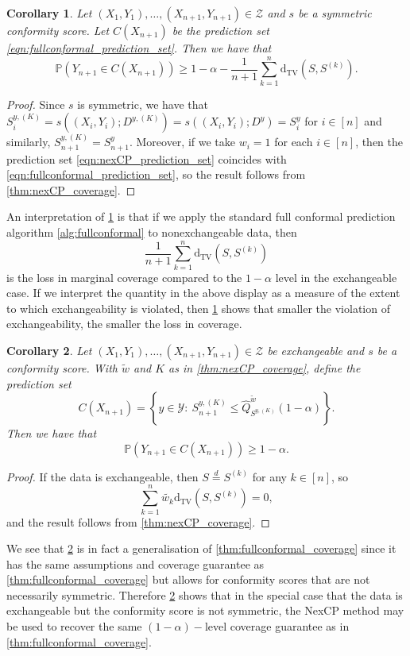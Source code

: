 \documentclass[11pt, titlepage]{article} %
\newcommand{\R}{\mathrm}
\newcommand{\Prob}[1]{\mathbb{P}\left( #1 \right)}
\numberwithin{equation}{section}
\newtheorem{corollary}{Corollary}
\theoremstyle{definition}
\numberwithin{theorem}{section}
\numberwithin{lemma}{section}
\numberwithin{corollary}{section}
\numberwithin{proposition}{section}
\numberwithin{definition}{section}
\numberwithin{remark}{section}
\begin{document}
\begin{corollary}
    Let \((X_1, Y_1), \ldots, (X_{n+1}, Y_{n+1}) \in \mathcal{Z}\) and \(s\) be a symmetric conformity score. Let \(C(X_{n+1})\) be the prediction set \eqref{eqn:fullconformal_prediction_set}. Then we have that \[
        \Prob{Y_{n+1} \in C(X_{n+1})}  \geq 1-\alpha - \frac{1}{n+1} \sum_{k=1}^{n} \R{d_{TV}}(S, S^{(k)}).
    \]
\label{corr:nexCP_robustness}
\end{corollary}
\begin{proof}
    Since \(s\) is symmetric, we have that \(S_{i}^{y, (K)} = s((X_i, Y_i); D^{y, (K)}) = s((X_i, Y_i); D^{y}) = S_i^y\) for \(i \in [n]\) and similarly, \(S_{n+1}^{y, (K)} = S_{n+1}^y\). Moreover, if we take \(w_i = 1\) for each \(i \in [n]\), then the prediction set \eqref{eqn:nexCP_prediction_set} coincides with \eqref{eqn:fullconformal_prediction_set}, so the result follows from \cref{thm:nexCP_coverage}.
\end{proof}

\noindent
An interpretation of \cref{corr:nexCP_robustness} is that if we apply the standard full conformal prediction algorithm \cref{alg:fullconformal} to nonexchangeable data, then \[\frac{1}{n+1} \sum_{k=1}^{n} \R{d_{TV}}(S, S^{(k)})\] is the loss in marginal coverage compared to the \(1-\alpha\) level in the exchangeable case. If we interpret the quantity in the above display as a measure of the extent to which exchangeability is violated, then \cref{corr:nexCP_robustness} shows that smaller the violation of exchangeability, the smaller the loss in coverage.

\begin{corollary}
    Let \((X_1, Y_1), \ldots, (X_{n+1}, Y_{n+1}) \in \mathcal{Z}\) be exchangeable and \(s\) be a conformity score. With \(\tilde{w}\) and \(K\) as in \cref{thm:nexCP_coverage}, define the prediction set \[C(X_{n+1}) = \left\{ y \in \mathcal{Y} : \ S_{n+1}^{y, (K)} \leq \hat{Q}_{S^{y, (K)}}^{\tilde{w}}(1-\alpha)  \right\}.\] Then we have that \[
        \Prob{Y_{n+1} \in C(X_{n+1})}  \geq 1-\alpha.
    \]
\label{corr:nexCP_exchangeable}
\end{corollary}
\begin{proof}
    If the data is exchangeable, then \(S \overset{d}{=} S^{(k)}\) for any \(k \in [n] \), so \[\sum_{k=1}^n \tilde{w_k} \R{d_{TV}}(S, S^{(k)}) = 0,\] and the result follows from \cref{thm:nexCP_coverage}.
\end{proof}

\noindent
We see that \cref{corr:nexCP_exchangeable} is in fact a generalisation of \cref{thm:fullconformal_coverage} since it has the same assumptions and coverage guarantee as \cref{thm:fullconformal_coverage} but allows for conformity scores that are not necessarily symmetric. Therefore \cref{corr:nexCP_exchangeable} shows that in the special case that the data is exchangeable but the conformity score is not symmetric, the NexCP method may be used to recover the same \((1-\alpha)-\)level coverage guarantee as in \cref{thm:fullconformal_coverage}. \vskip5pt
\end{document}
